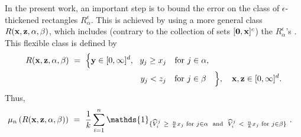 In the present work,  an important step is to bound the error on the
class of $\epsilon$-thickened rectangles $R_\alpha^\epsilon$. This is achieved by
using a more general class $R(\mathbf x, \mathbf z, \alpha, \beta)$, which includes (contrary to the collection of sets $[\mathbf 0,\mathbf x]^c$) the $R_\alpha^\epsilon$'s . 
This flexible class is defined by
\begin{align}
\nonumber R(\mathbf x, \mathbf z, \alpha, \beta) &~=~ \Big\{ \mathbf y \in [0, \infty]^d,
~~ y_j \ge x_j ~~\text{ for } j \in \alpha, 
\\&~~~~~~~~~~~~~~~~~~~~~~~~~~ y_j < z_j ~~\text{ for } j \in \beta \quad \Big\},
~~~  \mathbf x, \mathbf z \in [0, \infty]^{d}. \label{jmva:set-R}
\end{align}
Thus,
\begin{align*}
\mu_n \left( R(\mb x, \mb z, \alpha, \beta) \right) & ~=~ \frac{1}{k}
\sum_{i=1}^n \mathds{1}_{\{ \widehat V_i^j ~\ge~ \frac{n}{k} x_j  \text{ for } j \in \alpha \text{ ~and~ } \widehat V_i^j ~<~\frac{n}{k} x_j  \text{ for } j \in \beta \}}~.
\end{align*}

